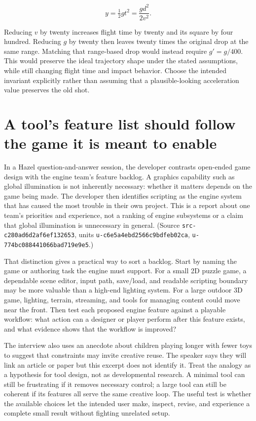 \[
y=\tfrac12g t^2=\frac{g d^2}{2v^2}.
\]

Reducing \(v\) by twenty increases flight time by twenty and its square by four hundred. Reducing \(g\) by twenty then leaves twenty times the original drop at the same range. Matching that range-based drop would instead require \(g'=g/400\). This would preserve the ideal trajectory shape under the stated assumptions, while still changing flight time and impact behavior. Choose the intended invariant explicitly rather than assuming that a plausible-looking acceleration value preserves the old shot.

\section{A tool's feature list should follow the game it is meant to enable}\label{06-engine-ii-ch047-a-tools-feature-list-should-follow-the-game-it-is-meant-to-enable}

In a Hazel question-and-answer session, the developer contrasts open-ended game design with the engine team's feature backlog. A graphics capability such as global illumination is not inherently necessary: whether it matters depends on the game being made. The developer then identifies scripting as the engine system that has caused the most trouble in their own project. This is a report about one team's priorities and experience, not a ranking of engine subsystems or a claim that global illumination is unnecessary in general. (Source \texttt{src-c280ad6d2af6ef132653}, units \texttt{u-c6e5a4ebd2566c9bdfeb02ca}, \texttt{u-774bc088441066bad719e9e5}.)

That distinction gives a practical way to sort a backlog. Start by naming the game or authoring task the engine must support. For a small 2D puzzle game, a dependable scene editor, input path, save/load, and readable scripting boundary may be more valuable than a high-end lighting system. For a large outdoor 3D game, lighting, terrain, streaming, and tools for managing content could move near the front. Then test each proposed engine feature against a playable workflow: what action can a designer or player perform after this feature exists, and what evidence shows that the workflow is improved?

The interview also uses an anecdote about children playing longer with fewer toys to suggest that constraints may invite creative reuse. The speaker says they will link an article or paper but this excerpt does not identify it. Treat the analogy as a hypothesis for tool design, not as developmental research. A minimal tool can still be frustrating if it removes necessary control; a large tool can still be coherent if its features all serve the same creative loop. The useful test is whether the available choices let the intended user make, inspect, revise, and experience a complete small result without fighting unrelated setup.

